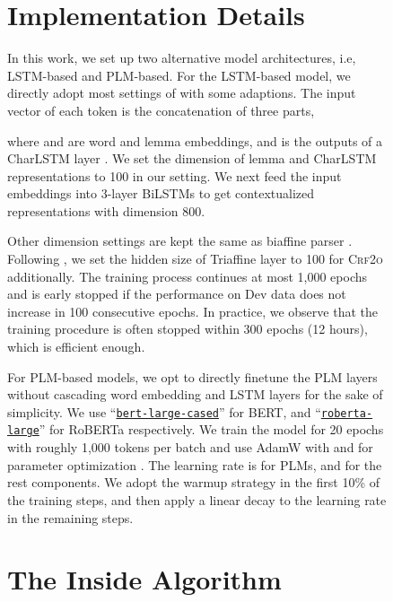 \documentclass[11pt]{article}
\begin{document}
\begin{figure}[tb!]



\appendix

\section{Implementation Details}\label{sec:impl}

In this work, we set up two alternative model architectures, i.e, LSTM-based and PLM-based.
For the LSTM-based model, we directly adopt most settings of \citet{dozat-etal-2017-biaffine} with some adaptions.
The input vector of each token  is the concatenation of three parts,

where  and  are word and lemma embeddings, and  is the outputs of a CharLSTM layer \cite{lample-etal-2016-neural}.
We set the dimension of lemma and CharLSTM representations to 100 in our setting.
We next feed the input embeddings into 3-layer BiLSTMs \cite{yarin-etal-2016-dropout} to get contextualized representations with dimension 800.

Other dimension settings are kept the same as biaffine parser \cite{dozat-etal-2017-biaffine}.
Following \citet{zhang-etal-2020-efficient}, we set the hidden size of Triaffine layer to 100 for \textsc{Crf2o} additionally.
The training process continues at most 1,000 epochs and is early stopped if the performance on Dev data does not increase in 100 consecutive epochs.
In practice, we observe that the training procedure is often stopped within 300 epochs (12 hours), which is efficient enough.

For PLM-based models, we opt to directly finetune the PLM layers without cascading word embedding and LSTM layers for the sake of simplicity.
We use ``\href{https://huggingface.co/bert-large-cased}{\texttt{bert-large-cased}}'' for BERT, and ``\href{https://huggingface.co/roberta-large}{\texttt{roberta-large}}'' for RoBERTa respectively.
We train the model for 20 epochs with roughly 1,000 tokens per batch and use AdamW \cite{kingma-ba-2015-adam,ilya-etal-2018-adamw} with  and  for parameter optimization .
The learning rate is  for PLMs, and  for the rest components.
We adopt the warmup strategy in the first 10\% of the training steps, and then apply a linear decay to the learning rate in the remaining steps.

\section{The Inside Algorithm}\label{sec:inside}


\end{figure}
\end{document}
